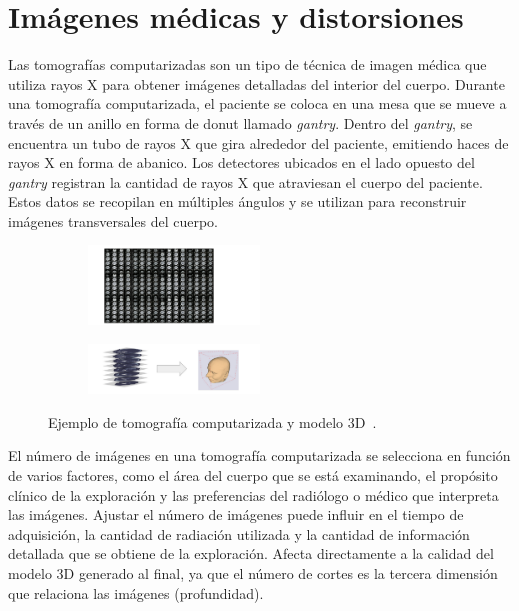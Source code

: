 \section{Imágenes médicas y distorsiones}
\label{sec:Distorsiones}
Las tomografías computarizadas son un tipo de técnica de imagen médica 
que utiliza rayos X para obtener imágenes detalladas del interior del cuerpo. 
Durante una tomografía computarizada, el paciente se coloca en una mesa que se 
mueve a través de un anillo en forma de donut llamado \emph{gantry}. Dentro del \emph{gantry},
se encuentra un tubo de rayos X que gira alrededor del paciente, emitiendo haces 
de rayos X en forma de abanico.
Los detectores ubicados en el lado opuesto del \emph{gantry} registran la cantidad de 
rayos X que atraviesan el cuerpo del paciente. Estos datos se recopilan en 
múltiples ángulos y se utilizan para reconstruir imágenes transversales del cuerpo. 

\begin{figure}[htp]
  \begin{subfigure}{2\textwidth}
  \hspace{1cm}\includegraphics[width=0.5\textwidth]{imagenes/chapter2/CTDir.png}
  \end{subfigure}
  \begin{subfigure}{2\textwidth}
  \includegraphics[width=0.5\textwidth]{imagenes/chapter2/CT2Volume.png}
  \end{subfigure}
  \caption[Ejemplo de tomografía computarizada y modelo 3D.]{Ejemplo de tomografía computarizada y modelo 3D~\cite{CT2Volume}.}
  \label{fig:CT2Volume}
\end{figure}

El número de imágenes en una tomografía computarizada se selecciona en función 
de varios factores, como el área del cuerpo que se está examinando, el propósito 
clínico de la exploración y las preferencias del radiólogo o médico que interpreta 
las imágenes. Ajustar el número de imágenes puede influir en el tiempo de adquisición, 
la cantidad de radiación utilizada y la cantidad de información detallada que se 
obtiene de la exploración. Afecta directamente a la calidad del modelo 3D generado 
al final, ya que el número de cortes es la tercera dimensión que relaciona las imágenes 
(profundidad).

